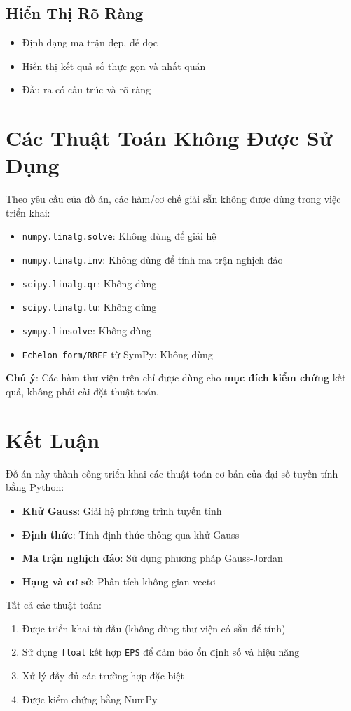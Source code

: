 \documentclass[12pt, a4paper, twoside]{article}
\begin{document}
\subsection{Hiển Thị Rõ Ràng}

\begin{itemize}
    \item Định dạng ma trận đẹp, dễ đọc
    \item Hiển thị kết quả số thực gọn và nhất quán
    \item Đầu ra có cấu trúc và rõ ràng
\end{itemize}

\section{Các Thuật Toán Không Được Sử Dụng}

Theo yêu cầu của đồ án, các hàm/cơ chế giải sẵn không được dùng trong việc triển khai:

\begin{itemize}
    \item \texttt{numpy.linalg.solve}: Không dùng để giải hệ
    \item \texttt{numpy.linalg.inv}: Không dùng để tính ma trận nghịch đảo
    \item \texttt{scipy.linalg.qr}: Không dùng
    \item \texttt{scipy.linalg.lu}: Không dùng
    \item \texttt{sympy.linsolve}: Không dùng
    \item \texttt{Echelon form/RREF} từ SymPy: Không dùng
\end{itemize}

\textbf{Chú ý}: Các hàm thư viện trên chỉ được dùng cho \textbf{mục đích kiểm chứng} kết quả, không phải cài đặt thuật toán.

\section{Kết Luận}

Đồ án này thành công triển khai các thuật toán cơ bản của đại số tuyến tính bằng Python:

\begin{itemize}
    \item \textbf{Khử Gauss}: Giải hệ phương trình tuyến tính
    \item \textbf{Định thức}: Tính định thức thông qua khử Gauss
    \item \textbf{Ma trận nghịch đảo}: Sử dụng phương pháp Gauss-Jordan
    \item \textbf{Hạng và cơ sở}: Phân tích không gian vectơ
\end{itemize}

Tất cả các thuật toán:
\begin{enumerate}
    \item Được triển khai từ đầu (không dùng thư viện có sẵn để tính)
    \item Sử dụng \texttt{float} kết hợp \texttt{EPS} để đảm bảo ổn định số và hiệu năng
    \item Xử lý đầy đủ các trường hợp đặc biệt
    \item Được kiểm chứng bằng NumPy
\end{enumerate}
\end{document}
